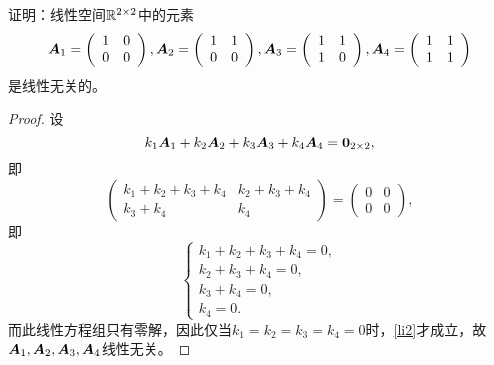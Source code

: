 \begin{frame}
\begin{li}
证明：线性空间$\mathbb R^{2\times 2}$中的元素
$$
\boldsymbol{A}_1=\left(\begin{array}{cc} 1&0\\0&0 \end{array}\right), 
\boldsymbol{A}_2=\left(\begin{array}{cc} 1&1\\0&0 \end{array}\right), 
\boldsymbol{A}_3=\left(\begin{array}{cc} 1&1\\1&0 \end{array}\right), 
\boldsymbol{A}_4=\left(\begin{array}{cc} 1&1\\1&1 \end{array}\right) 
$$
是线性无关的。
\end{li} \pause 

\begin{proof}
设
\begin{equation}\label{li2}
k_1\MA_1 + k_2\MA_2 + k_3\MA_3 + k_4\MA_4 = \M0_{2\times 2},
\end{equation}
即
$$
\left(\begin{array}{cc} k_1+k_2+k_3+k_4&k_2+k_3+k_4\\k_3+k_4&k_4 \end{array}\right)=
\left(\begin{array}{cc} 0&0\\0&0 \end{array}\right),
$$
即
$$
\left\{
\begin{array}{r}
k_1+k_2+k_3+k_4=0,\\
k_2+k_3+k_4=0,\\
k_3+k_4=0,\\
k_4=0.
\end{array}
\right.
$$
而此线性方程组只有零解，因此仅当$k_1=k_2=k_3=k_4=0$时，\eqref{li2}才成立，故$\boldsymbol{A}_1,\boldsymbol{A}_2,\boldsymbol{A}_3,\boldsymbol{A}_4$线性无关。
\end{proof}
\end{frame}

